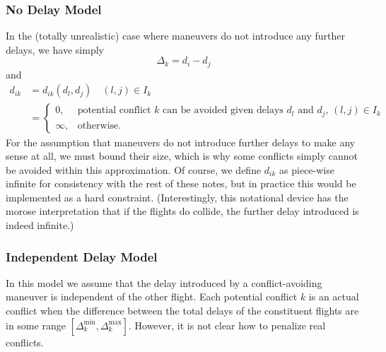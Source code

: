 \documentclass{article}
\begin{document}
\subsubsection{No Delay Model}

In the (totally unrealistic) case where maneuvers do not introduce any further delays, we have simply
\begin{equation*}
    \Delta_k = d_i - d_j
\end{equation*}
and 
\begin{align*}
    d_{ik} &= d_{ik}(d_l, d_j) \quad (l, j) \in I_k \\
           &= 
            \begin{cases} 
                0,      & \text{potential conflict $k$ can be avoided given delays $d_l$ and $d_j$, $(l, j) \in I_k$}\\
                \infty, & \text{otherwise}.
            \end{cases}
\end{align*}
For the assumption that maneuvers do not introduce further delays to make any sense at all, we must bound their size, which is why some conflicts simply cannot be avoided within this approximation.
Of course, we define $d_{ik}$ as piece-wise infinite for consistency with the rest of these notes, but in practice this would be implemented as a hard constraint.
(Interestingly, this notational device has the morose interpretation that if the flights do collide, the further delay introduced is indeed infinite.)

\subsubsection{Independent Delay Model}
In this model we assume that the delay introduced by a conflict-avoiding 
maneuver is independent of the other flight. 
Each potential conflict $k$ is an actual conflict when the difference between the total delays of the constituent flights are in some range $\left[\Delta_k^{\mathrm{min}}, \Delta_k^{\mathrm{max}}\right]$.
However, it is not clear how to penalize real conflicts.
\end{document}
